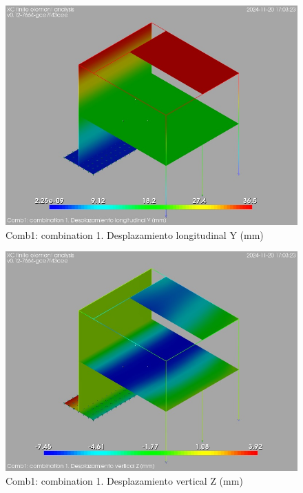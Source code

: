 \begin{figure}[ht]
\begin{center}
\includegraphics[width=\linewidth]{results/graphics/resSimplLC/LS1uY.png}
\caption{Comb1: combination 1. Desplazamiento longitudinal Y (mm)}
\label{LS1uY}
\end{center}
\end{figure}
\begin{figure}[ht]
\begin{center}
\includegraphics[width=\linewidth]{results/graphics/resSimplLC/LS1uZ.png}
\caption{Comb1: combination 1. Desplazamiento vertical Z (mm)}
\label{LS1uZ}
\end{center}
\end{figure}
